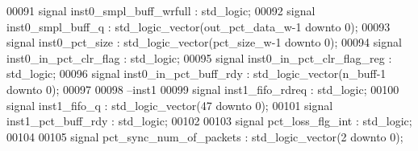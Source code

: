 \begin{DoxyCode}
00091 \textcolor{keywordflow}{signal} \textcolor{vhdlchar}{inst0_smpl_buff_wrfull}       \textcolor{vhdlchar}{:} \textcolor{comment}{std\_logic};
00092 \textcolor{keywordflow}{signal} \textcolor{vhdlchar}{inst0_smpl_buff_q}            \textcolor{vhdlchar}{:} \textcolor{comment}{std\_logic\_vector}\textcolor{vhdlchar}{(}\textcolor{vhdlchar}{out_pct_data_w}\textcolor{vhdlchar}{-}\textcolor{vhdllogic}{}\textcolor{vhdllogic}{1} \textcolor{keywordflow}{downto} \textcolor{vhdllogic}{}\textcolor{vhdllogic}{0}\textcolor{vhdlchar}{)};
00093 \textcolor{keywordflow}{signal} \textcolor{vhdlchar}{inst0_pct_size}               \textcolor{vhdlchar}{:} \textcolor{comment}{std\_logic\_vector}\textcolor{vhdlchar}{(}\textcolor{vhdlchar}{pct_size_w}\textcolor{vhdlchar}{-}\textcolor{vhdllogic}{}\textcolor{vhdllogic}{1} \textcolor{keywordflow}{downto} \textcolor{vhdllogic}{}\textcolor{vhdllogic}{0}\textcolor{vhdlchar}{)};
00094 \textcolor{keywordflow}{signal} \textcolor{vhdlchar}{inst0_in_pct_clr_flag}        \textcolor{vhdlchar}{:} \textcolor{comment}{std\_logic};
00095 \textcolor{keywordflow}{signal} \textcolor{vhdlchar}{inst0_in_pct_clr_flag_reg}    \textcolor{vhdlchar}{:} \textcolor{comment}{std\_logic};
00096 \textcolor{keywordflow}{signal} \textcolor{vhdlchar}{inst0_in_pct_buff_rdy}        \textcolor{vhdlchar}{:} \textcolor{comment}{std\_logic\_vector}\textcolor{vhdlchar}{(}\textcolor{vhdlchar}{n_buff}\textcolor{vhdlchar}{-}\textcolor{vhdllogic}{}\textcolor{vhdllogic}{1} \textcolor{keywordflow}{downto} \textcolor{vhdllogic}{}\textcolor{vhdllogic}{0}\textcolor{vhdlchar}{)};
00097 
00098 \textcolor{keyword}{--inst1}
00099 \textcolor{keywordflow}{signal} \textcolor{vhdlchar}{inst1_fifo_rdreq}             \textcolor{vhdlchar}{:} \textcolor{comment}{std\_logic};
00100 \textcolor{keywordflow}{signal} \textcolor{vhdlchar}{inst1_fifo_q}                 \textcolor{vhdlchar}{:} \textcolor{comment}{std\_logic\_vector}\textcolor{vhdlchar}{(}\textcolor{vhdllogic}{}\textcolor{vhdllogic}{47} \textcolor{keywordflow}{downto} \textcolor{vhdllogic}{}\textcolor{vhdllogic}{0}\textcolor{vhdlchar}{)};
00101 \textcolor{keywordflow}{signal} \textcolor{vhdlchar}{inst1_pct_buff_rdy}           \textcolor{vhdlchar}{:} \textcolor{comment}{std\_logic};
00102 
00103 \textcolor{keywordflow}{signal} \textcolor{vhdlchar}{pct_loss_flg_int}             \textcolor{vhdlchar}{:} \textcolor{comment}{std\_logic};
00104 
00105 \textcolor{keywordflow}{signal} \textcolor{vhdlchar}{pct_sync_num_of_packets}      \textcolor{vhdlchar}{:} \textcolor{comment}{std\_logic\_vector}\textcolor{vhdlchar}{(}\textcolor{vhdllogic}{}\textcolor{vhdllogic}{2} \textcolor{keywordflow}{downto} \textcolor{vhdllogic}{}\textcolor{vhdllogic}{0}\textcolor{vhdlchar}{)};

\end{DoxyCode}
